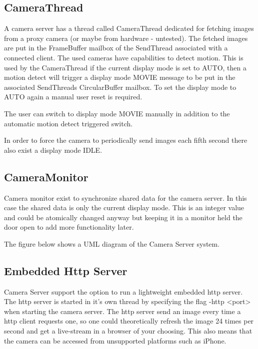 \documentclass[8pt,titlepage]{article}
\begin{document}
\subsection{CameraThread}
A camera server has a thread called CameraThread dedicated for fetching images from a proxy camera (or maybe from hardware - untested). The fetched images are put in the FrameBuffer mailbox of the SendThread associated with a connected client. The used cameras have capabilities to detect motion. This is used by the CameraThread if the current display mode is set to AUTO, then a motion detect will trigger a display mode MOVIE message to be put in the associated SendThreads CircularBuffer mailbox. To set the display mode to AUTO again a manual user reset is required. 

The user can switch to display mode MOVIE manually in addition to the automatic motion detect triggered switch.

In order to force the camera to periodically send images each fifth second there also exist a display mode IDLE.

\subsection{CameraMonitor}
Camera monitor exist to synchronize shared data for the camera server. In this case the shared data is only the current display mode. This is an integer value and could be atomically changed anyway but keeping it in a monitor held the door open to add more functionality later.

The figure below shows a UML diagram of the Camera Server system. 

\subsection{Embedded Http Server}
Camera Server support the option to run a lightweight embedded http server. The http server is started in it’s own thread by specifying the flag -http <port> when starting the camera server. The http server send an image every time a http client requests one, so one could theoretically refresh the image 24 times per second and get a live-stream in a browser of your choosing. This also means that the camera can be accessed from unsupported platforms such as iPhone.
\end{document}

